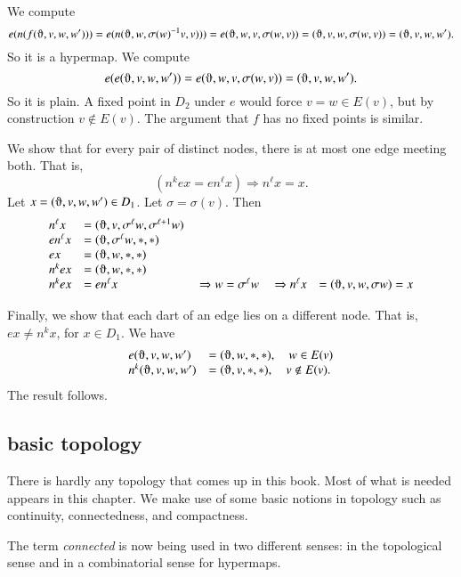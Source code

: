 \begin{lemma}  We compute
    $$e(n(f(\orgn,v,w,w'))) = e(n(\orgn,w,\sigma(w)^{-1} v,v))) =
        e(\orgn,w,v,\sigma(w, v)) = (\orgn,v,w,\sigma(w, v)) = (\orgn,v,w,w').$$
So it is a hypermap. We compute
    $$e(e(\orgn,v,w,w')) = e(\orgn,w,v,\sigma(w,v)) = (\orgn,v,w,w').$$
So it is plain. A fixed point in $D_2$ under $e$ would force $v = w\in E(v)$,
but by construction $v\not\in E(v)$.  The argument that $f$ has no
fixed points is similar.

   We show that for every pair of distinct nodes, there is at most one edge
meeting both.
That is,
        $$(n^k e x = e n^\ell x)\Rightarrow n^\ell x = x.$$
Let $x = (\orgn,v,w,w')\in D_1$.  Let $\sigma=\sigma(v)$. Then
    $$
    \begin{array}{lllllll}
    n^\ell x &= (\orgn,v,\sigma^\ell w,\sigma^{\ell+1}w)\\
    e n^\ell x &= (\orgn,\sigma^\ell w,*,*)\\
    e x &= (\orgn,w,*,*)\\
    n^k e x &= (\orgn,w,*,*)\\
    n^k e x &= e n^\ell x &\ \Rightarrow w = \sigma^\ell w &\ \Rightarrow
    n^\ell x &= (\orgn,v,w,\sigma w) = x
    \end{array}
    $$

Finally, we show that each dart of an edge lies on a different node.
That is, $e x \ne n^k x$, for $x\in D_1$.  We have
    $$
    \begin{array}{lll}
        e(\orgn,v,w,w') &= (\orgn,w,*,*),\quad w\in E(v)\\
        n^k(\orgn,v,w,w') &= (\orgn,v,*,*),\quad v\not\in E(v).
    \end{array}
    $$
The result follows.
\end{lemma}

\subsection{basic topology}

There is hardly any topology that comes up in this book.  Most of
what is needed appears in this chapter.  We make use of some basic
notions in topology such as continuity, connectedness, and compactness.

\begin{remark} The term {\it connected} is now being used in
two different senses: in the topological sense and in a combinatorial
sense for hypermaps.
\end{remark}





